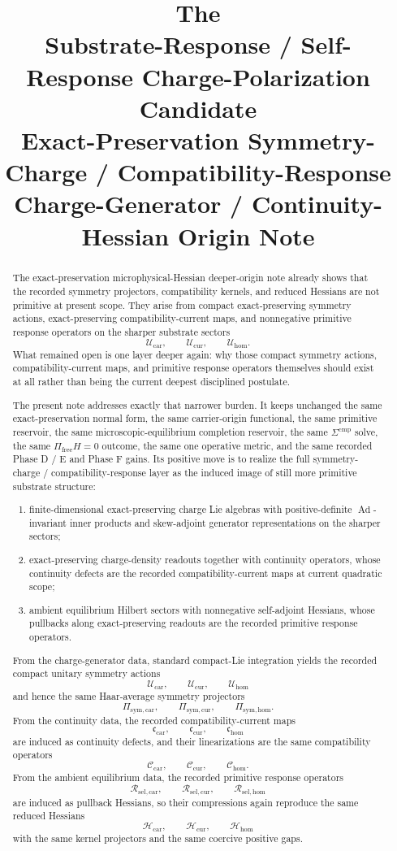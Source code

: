 \documentclass[11pt]{article}
\title{\textbf{The \TheoryName{}}\\[0.4em]
\large Substrate-Response / Self-Response Charge-Polarization Candidate\\
\large Exact-Preservation Symmetry-Charge / Compatibility-Response\\
\large Charge-Generator / Continuity-Hessian Origin Note}
\author{}
\date{}
\newcommand{\RootTensorClass}{\mathscr U_{\mathrm{car}}}
\newcommand{\RootRelabelClass}{\mathscr U_{\mathrm{cur}}}
\newcommand{\RootFreeClass}{\mathscr U_{\mathrm{hom}}}
\newcommand{\TensorSymProj}{\Pi_{\mathrm{sym,car}}}
\newcommand{\CurSymProj}{\Pi_{\mathrm{sym,cur}}}
\newcommand{\HomSymProj}{\Pi_{\mathrm{sym,hom}}}
\newcommand{\TensorCompat}{\mathcal C_{\mathrm{car}}}
\newcommand{\CurCompat}{\mathcal C_{\mathrm{cur}}}
\newcommand{\HomCompat}{\mathcal C_{\mathrm{hom}}}
\newcommand{\TensorHess}{\mathcal H_{\mathrm{car}}}
\newcommand{\CurHess}{\mathcal H_{\mathrm{cur}}}
\newcommand{\HomHess}{\mathcal H_{\mathrm{hom}}}
\newcommand{\TensorSymAct}{\mathscr U_{\mathrm{car}}}
\newcommand{\CurSymAct}{\mathscr U_{\mathrm{cur}}}
\newcommand{\HomSymAct}{\mathscr U_{\mathrm{hom}}}
\newcommand{\TensorCurrent}{\mathfrak c_{\mathrm{car}}}
\newcommand{\CurCurrent}{\mathfrak c_{\mathrm{cur}}}
\newcommand{\HomCurrent}{\mathfrak c_{\mathrm{hom}}}
\newcommand{\TensorResp}{\mathcal R_{\mathrm{sel,car}}}
\newcommand{\CurResp}{\mathcal R_{\mathrm{sel,cur}}}
\newcommand{\HomResp}{\mathcal R_{\mathrm{sel,hom}}}
\begin{document}
\maketitle

\begin{abstract}
The exact-preservation microphysical-Hessian deeper-origin note already shows that the recorded symmetry projectors, compatibility kernels, and reduced Hessians are not primitive at present scope. They arise from compact exact-preserving symmetry actions, exact-preserving compatibility-current maps, and nonnegative primitive response operators on the sharper substrate sectors
\[
\RootTensorClass,\qquad
\RootRelabelClass,\qquad
\RootFreeClass.
\]
What remained open is one layer deeper again: why those compact symmetry actions, compatibility-current maps, and primitive response operators themselves should exist at all rather than being the current deepest disciplined postulate.

The present note addresses exactly that narrower burden. It keeps unchanged the same exact-preservation normal form, the same carrier-origin functional, the same primitive reservoir, the same microscopic-equilibrium completion reservoir, the same \(\Sigma^{\mathrm{cmp}}\) solve, the same \(\Pi_{\mathrm{free}}H=0\) outcome, the same one operative metric, and the same recorded Phase D / E and Phase F gains. Its positive move is to realize the full symmetry-charge / compatibility-response layer as the induced image of still more primitive substrate structure:
\begin{enumerate}
    \item finite-dimensional exact-preserving charge Lie algebras with positive-definite \(\operatorname{Ad}\)-invariant inner products and skew-adjoint generator representations on the sharper sectors;
    \item exact-preserving charge-density readouts together with continuity operators, whose continuity defects are the recorded compatibility-current maps at current quadratic scope;
    \item ambient equilibrium Hilbert sectors with nonnegative self-adjoint Hessians, whose pullbacks along exact-preserving readouts are the recorded primitive response operators.
\end{enumerate}

From the charge-generator data, standard compact-Lie integration yields the recorded compact unitary symmetry actions
\[
\TensorSymAct,\qquad
\CurSymAct,\qquad
\HomSymAct
\]
and hence the same Haar-average symmetry projectors
\[
\TensorSymProj,\qquad
\CurSymProj,\qquad
\HomSymProj.
\]
From the continuity data, the recorded compatibility-current maps
\[
\TensorCurrent,\qquad
\CurCurrent,\qquad
\HomCurrent
\]
are induced as continuity defects, and their linearizations are the same compatibility operators
\[
\TensorCompat,\qquad
\CurCompat,\qquad
\HomCompat.
\]
From the ambient equilibrium data, the recorded primitive response operators
\[
\TensorResp,\qquad
\CurResp,\qquad
\HomResp
\]
are induced as pullback Hessians, so their compressions again reproduce the same reduced Hessians
\[
\TensorHess,\qquad
\CurHess,\qquad
\HomHess
\]
with the same kernel projectors and the same coercive positive gaps.


\end{abstract}
\end{document}
